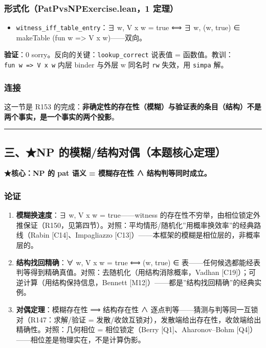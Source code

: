 \documentclass[
]{article}
\providecommand{\tightlist}{%
 \setlength{\itemsep}{0pt}\setlength{\parskip}{0pt}}
\begin{document}
\subsubsection{形式化（PatPvsNPExercise.lean，1
定理）}\label{ux5f62ux5f0fux5316patpvsnpexercise.lean1-ux5b9aux7406-1}

\begin{itemize}
\tightlist
\item
 \texttt{witness\_iff\_table\_entry}：∃ w, V x w = true ⟺ ∃ w, (w,
 true) ∈ makeTable (fun w =\textgreater{} V x w)------双向。
\end{itemize}

\textbf{验证}：0 sorry。反向的关键：\texttt{lookup\_correct} 说表值 =
函数值。教训：\texttt{fun\ w\ =\textgreater{}\ V\ x\ w} 内层 binder
与外层 w 同名时 \texttt{rw} 失效，用 \texttt{simpa} 解。

\subsubsection{连接}\label{ux8fdeux63a5-1}

这一节是 R153
的完成：\textbf{非确定性的存在性（模糊）与验证表的条目（结构）不是两个事实，是一个事实的两个投影}。

\begin{center}\rule{0.5\linewidth}{0.5pt}\end{center}

\subsection{三、★NP
的模糊/结构对偶（本题核心定理）}\label{ux4e09np-ux7684ux6a21ux7ccaux7ed3ux6784ux5bf9ux5076ux672cux9898ux6838ux5fc3ux5b9aux7406}

\textbf{★核心：NP 的 pat 语义 = 模糊存在性 ∧ 结构判等同时成立。}

\subsubsection{论证}\label{ux8bbaux8bc1-2}

\begin{enumerate}
\def\labelenumi{\arabic{enumi}.}
\tightlist
\item
 \textbf{模糊换速度}：∃ w, V x w = true------witness
 的存在性不穷举，由相位锁定外推保证（R150，见第四节）。对照：平均情形/随机化''用概率换效率''的经典路线（Rabin
 {[}C14{]}、Impagliazzo
 {[}C13{]}）------本框架的模糊是相位层的，非概率层的。
\item
 \textbf{结构找回精确}：∀ w, V x w = true ⟺ (w, true) ∈
 表------任何候选都能经表判等得到精确真值。对照：去随机化（用结构消除概率，Vadhan
 {[}C19{]}）；可逆计算（用结构保持信息，Bennett
 {[}M12{]}）------都是''结构找回精确''的经典实例。
\item
 \textbf{对偶定理}：模糊存在性 ⟹ 结构存在性 ∧
 逐点判等------猜测与判等同一互锁对（R147：求解/验证 =
 发散/收敛互锁对），发散端给出存在性，收敛端给出精确性。对照：几何相位
 = 相位锁定（Berry {[}Q1{]}、Aharonov--Bohm
 {[}Q4{]}）------相位差是物理实在，不是计算伪影。
\end{enumerate}
\end{document}

